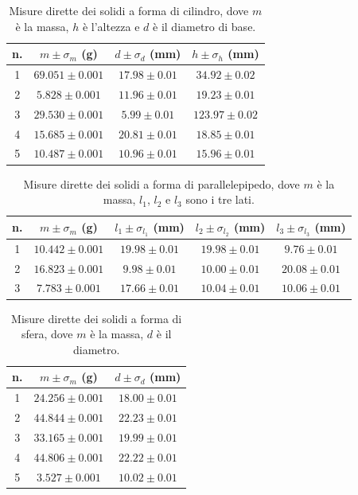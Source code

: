\documentclass[a4paper]{article}
\begin{document}
\begin{table}[htbp]
    \centering
    \begin{tabular}{c|c|c|c}
      n. & $m\pm \sigma_m$ (g)   & $d\pm\sigma_d$ (mm)  & $h\pm\sigma_h$ (mm)\\
      \hline
      1 & $69.051 \pm 0.001$ & $17.98 \pm 0.01$ & $34.92 \pm 0.02$ \\
      2 & $5.828 \pm 0.001$ & $11.96 \pm 0.01$ & $19.23 \pm 0.01$ \\
      3 & $29.530 \pm 0.001$ & $5.99 \pm 0.01$ & $123.97 \pm 0.02$ \\
      4 & $15.685 \pm 0.001$ & $20.81 \pm 0.01$ & $18.85 \pm 0.01$ \\
      5 & $10.487 \pm 0.001$ & $10.96 \pm 0.01$ & $15.96 \pm 0.01$ \\
    \end{tabular}
    \caption{Misure dirette dei solidi a forma di cilindro, dove $m$ \`e la massa, $h$ \`e l'altezza e $d$ \`e il diametro di base.}
    \label{tab:dir_cilindri}
\end{table}

\begin{table}[htbp]
    \centering
    \begin{tabular}{c|c|c|c|c}
      n. & $m\pm \sigma_m$ (g)   & $l_1\pm\sigma_{l_1}$ (mm)  & $l_2\pm\sigma_{l_2}$ (mm)& $l_3\pm\sigma_{l_3}$ (mm)\\
      \hline
      1 & $10.442 \pm 0.001$ & $19.98 \pm 0.01$ & $19.98 \pm 0.01$ & $9.76 \pm 0.01$ \\
      2 & $16.823 \pm 0.001$ & $9.98 \pm 0.01$ & $10.00 \pm 0.01$ & $20.08 \pm 0.01$ \\
      3 & $7.783 \pm 0.001$ & $17.66 \pm 0.01$ & $10.04 \pm 0.01$ & $10.06 \pm 0.01$ \\
    \end{tabular}
    \caption{Misure dirette dei solidi a forma di parallelepipedo, dove $m$ \`e la massa, $l_1$, $l_2$ e $l_3$ sono i tre lati.}
    \label{tab:dir_parallelepipedi}
\end{table}

\begin{table}[htbp]
    \centering
    \begin{tabular}{c|c|c}
      n. & $m\pm \sigma_m$ (g)   & $d\pm\sigma_d$ (mm)\\
      \hline
      1 & $24.256 \pm 0.001$ & $18.00 \pm 0.01$ \\
      2 & $44.844 \pm 0.001$ & $22.23 \pm 0.01$ \\
      3 & $33.165 \pm 0.001$ & $19.99 \pm 0.01$ \\
      4 & $44.806 \pm 0.001$ & $22.22 \pm 0.01$ \\
      5 & $3.527 \pm 0.001$ & $10.02 \pm 0.01$ \\
    \end{tabular}
    \caption{Misure dirette dei solidi a forma di sfera, dove $m$ \`e la massa, $d$ \`e il diametro.}
    \label{tab:dir_sfere}
\end{table}
\end{document}
